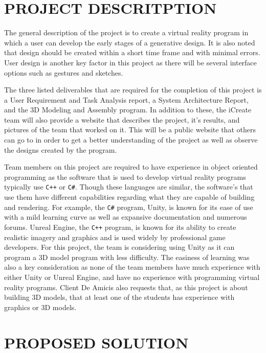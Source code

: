 \documentclass[letterpaper,draftclsnofoot,onecolumn,10 pt]{IEEEtran}
\begin{document}
\section{PROJECT DESCRITPTION}
The general description of the project is to create a virtual reality program in which a user can develop the early stages of a generative design. It is also noted that design should be created within a short time frame and with minimal errors. User design is another key factor in this project as there will be several interface options such as gestures and sketches. \par
	The three listed deliverables that are required for the completion of this project is a User Requirement and Task Analysis report, a System Architecture Report, and the 3D Modeling and Assembly program. In addition to these, the iCreate team will also provide a website that describes the project, it’s results, and pictures of the team that worked on it. This will be a public website that others can go to in order to get a better understanding of the project as well as observe the designs created by the program.\par
    Team members on this project are required to have experience in object oriented programming as the software that is used to develop virtual reality programs typically use \Verb!C++! or \Verb!C#!. Though these languages are similar, the software’s that use them have different capabilities regarding what they are capable of building and rendering. For example, the \Verb!C#! program, Unity, is known for its ease of use with a mild learning curve as well as expansive documentation and numerous forums. Unreal Engine, the \Verb!C++! program, is known for its ability to create realistic imagery and graphics and is used widely by professional game developers. For this project, the team is considering using Unity as it can program a 3D model program with less difficulty. The easiness of learning was also a key consideration as none of the team members have much experience with either Unity or Unreal Engine, and have no experience with programming virtual reality programs. Client De Amicis also requests that, as this project is about building 3D models, that at least one of the students has experience with graphics or 3D models.
\linebreak
\linebreak

\section{PROPOSED SOLUTION}
\end{document}
